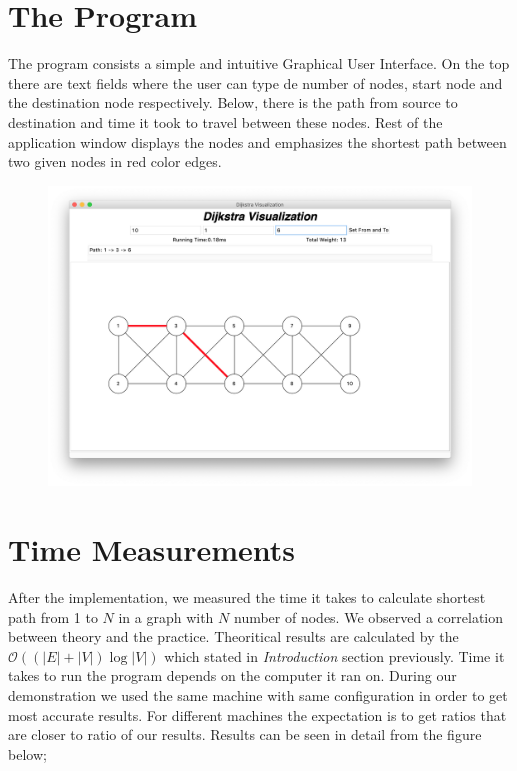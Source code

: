 \documentclass[twocolumns]{IEEEtran}
\begin{document}
	\section{The Program}

	The program consists a simple and intuitive Graphical User Interface. On the top there are text fields where the user can type de number of nodes, start node and the destination node respectively. Below, there is the path from source to destination and time it took to travel between these nodes. Rest of the application window displays the nodes and emphasizes the shortest path between two given nodes in red color edges.

	\begin{figure}[h]
		\centering
		\includegraphics[scale=.2]{main_window.png}
	\end{figure}
	
	\section{Time Measurements}
	
	After the implementation, we measured the time it takes to calculate shortest path from 1 to $N$ in a graph with $N$ number of nodes. We observed a correlation between theory and the practice.
	Theoritical results are calculated by the $\mathcal{O}((|E| + |V|) \log{|V|})$ which stated in \textit{Introduction} section previously. Time it takes to run the program depends on the computer it ran on. During our demonstration we used the same machine with same configuration in order to get most accurate results. For different machines the expectation is to get ratios that are closer to ratio of our results. Results can be seen in detail from the figure below; \\
	
\end{document}
